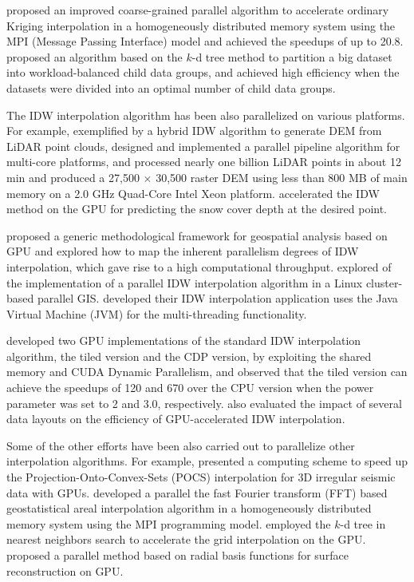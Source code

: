 \documentclass[final,5p,times,twocolumn,authoryear]{elsarticle}
\begin{document}
\cite{13DBLP:journals/gandc/HuS15} proposed an improved coarse-grained parallel 
algorithm to accelerate ordinary Kriging interpolation in a homogeneously 
distributed memory system using the MPI (Message Passing Interface) model 
and achieved the speedups of up to 20.8. \cite{14doi:10.1080/15481603.2014.1002379} 
proposed an algorithm based on the $k$-d tree method to partition a big dataset 
into workload-balanced child data groups, and achieved high efficiency when 
the datasets were divided into an optimal number of child data groups.

The IDW interpolation algorithm has been also parallelized on various 
platforms. For example, exemplified by a hybrid IDW algorithm to generate 
DEM from LiDAR point clouds, \cite{15DBLP:journals/gandc/GuanW10} designed and 
implemented a parallel pipeline algorithm for multi-core platforms, and 
processed nearly one billion LiDAR points in about 12 min and produced a 
27,500 $\times $ 30,500 raster DEM using less than 800 MB of main memory on a 
2.0 GHz Quad-Core Intel Xeon platform. \cite{16,17} accelerated the 
IDW method on the GPU for predicting the snow cover depth at the desired 
point.

\cite{18,19DBLP:journals/jzusc/XiaKL11} proposed a generic methodological framework for geospatial 
analysis based on GPU and explored how to map the inherent parallelism 
degrees of IDW interpolation, which gave rise to a high computational 
throughput. \cite{20DBLP:journals/gandc/HuangLTWCH11} explored of the implementation of a 
parallel IDW interpolation algorithm in a Linux cluster-based parallel GIS. 
\cite{21} developed their IDW interpolation application uses the 
Java Virtual Machine (JVM) for the multi-threading functionality.

\cite{22ISI:000332539900001} developed two GPU implementations of the standard IDW 
interpolation algorithm, the tiled version and the CDP version, by 
exploiting the shared memory and CUDA Dynamic Parallelism, and observed that 
the tiled version can achieve the speedups of 120 and 670 over the CPU 
version when the power parameter was set to 2 and 3.0, respectively. \cite{23} 
also evaluated the impact of several data layouts on the efficiency of 
GPU-accelerated IDW interpolation.

Some of the other efforts have been also carried out to parallelize other 
interpolation algorithms. For example, \cite{24DBLP:journals/gandc/WangGY10} presented a 
computing scheme to speed up the Projection-Onto-Convex-Sets (POCS) 
interpolation for 3D irregular seismic data with GPUs. \cite{25DBLP:journals/gis/GuanKG11}
developed a parallel the fast Fourier transform (FFT) based 
geostatistical areal interpolation algorithm in a homogeneously distributed 
memory system using the MPI programming model. \cite{26DBLP:journals/esi/HuangCCLW12}
employed the $k$-d tree in nearest neighbors search to accelerate the grid 
interpolation on the GPU. \cite{27DBLP:conf/fedcsis/CuomoGGS13} proposed a parallel method 
based on radial basis functions for surface reconstruction on GPU. 
\end{document}
